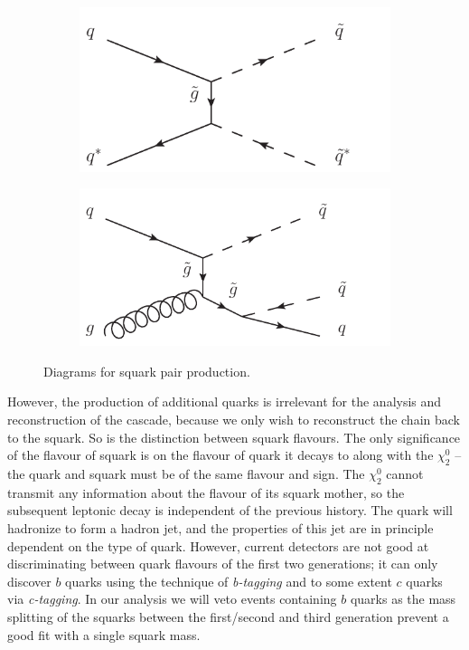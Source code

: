 \documentclass[twoside,english]{uiofysmaster}
\begin{document}
\begin{figure}[hbt]
	\begin{subfigure}[b]{0.4\textwidth}
		\includegraphics[width=\textwidth]{figures/qqbar_to_tildeqqbar.pdf} 
		\caption{ }
	\end{subfigure}
	\begin{subfigure}[b]{0.4\textwidth}
		\includegraphics[width=\textwidth]{figures/qg_to_tildeqqbar.pdf}
		\caption{ } 
	\end{subfigure}
	\caption{Diagrams for squark pair production.}
	\label{fig:squark_production_diagrams}
\end{figure}

However, the production of additional quarks is irrelevant for the analysis and reconstruction of the cascade, because we only wish to reconstruct the chain back to the squark. So is the distinction between squark flavours. The only significance of the flavour of squark is on the flavour of quark it decays to along with the $\chi_2^0$ -- the quark and squark must be of the same flavour and sign. The $\chi_2^0$ cannot transmit any information about the flavour of its squark mother, so the subsequent leptonic decay is independent of the previous history. The quark will hadronize to form a hadron jet, and the properties of this jet are in principle dependent on the type of quark. However, current detectors are not good at discriminating between quark flavours of the first two generations; it can only discover $b$ quarks using the technique of {\it b-tagging} and to some extent $c$ quarks via {\it c-tagging}. In our analysis we will veto events containing $b$ quarks as the mass splitting of the squarks between the first/second and third generation prevent a good fit with a single squark mass.
\end{document}
